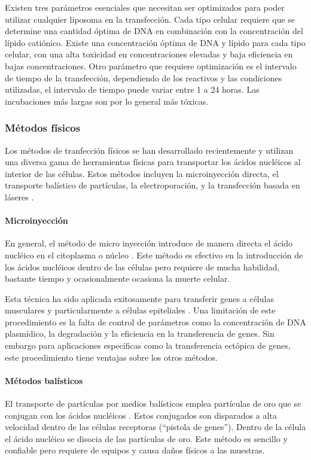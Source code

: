 \documentclass[fleqn,10pt]{SelfArx} %
\begin{document}
Existen tres parámetros esenciales que necesitan ser optimizados para poder utilizar cualquier liposoma en la transfección. Cada tipo celular requiere que se determine una cantidad óptima de DNA en combinación con la concentración del lípido catiónico. Existe una concentración óptima de DNA y lípido para cada tipo celular, con una alta toxicidad en concentraciones elevadas y baja eficiencia en bajas concentraciones. Otro parámetro que requiere optimización es el intervalo de tiempo de la transfección, dependiendo de los reactivos y las condiciones utilizadas, el intervalo de tiempo puede variar entre 1 a 24 horas. Las incubaciones más largas son por lo general más tóxicas.

\subsubsection{Métodos físicos}
Los métodos de tranfección físicos se han desarrollado recientemente y utilizan una diversa gama de herramientas físicas para transportar los ácidos nucléicos al interior de las células. Estos métodos incluyen la microinyección directa, el transporte balístico de partículas, la electroporación, y la transfección basada en láseres \cite{Mehier-Humbert:2005aa}.  

\paragraph*{Microinyección}
En general, el método de micro inyección introduce de manera directa el ácido nucléico en el citoplasma o núcleo \cite{Martinou:1995aa, Ikeda:1995aa}. Este método es efectivo en la introducción de los ácidos nucléicos dentro de las células pero requiere de mucha habilidad, bastante tiempo y ocasionalmente ocasiona la muerte celular. 

Esta técnica ha sido aplicada exitosamente para transferir genes a células musculares y particularmente a células epiteliales \cite{Sawamura:2002aa, Davis:1993aa}. Una limitación de este procedimiento es la falta de control de parámetros como la concentración de DNA plasmídico, la degradación y la eficiencia en la transferencia de genes. Sin embargo para aplicaciones específicas como la transferencia ectópica de genes, este procedimiento tiene ventajas sobre los otros métodos.

\paragraph*{Métodos balísticos}
El transporte de partículas por medios balísticos emplea partículas de oro que se conjugan con los ácidos nucléicos \cite{Lo:1994aa, OBrien:2006aa}. Estos conjugados son disparados a alta velocidad dentro de las células receptoras (``pistola de genes''). Dentro de la célula el ácido nucléico se disocia de las partículas de oro.  Este método es sencillo y confiable pero requiere de equipos y causa daños físicos a las muestras. 
\end{document}
